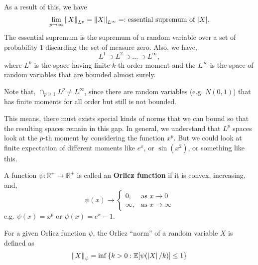 \documentclass[12pt]{article}
\begin{document}
As a result of this, we have
\begin{equation*}
    \lim_{p \to \infty} \left\Vert X \right\Vert_{L^p} = \left\Vert X \right\Vert_{L^\infty} =: \text{essential supremum of } |X|.
\end{equation*}
\noindent The essential supremum is the supremum of a random variable over a set of probability $1$ discarding the set of measure zero. Also, we have,
\begin{equation*}
    L^1 \supset L^2 \supset \dots \supset L^\infty,
\end{equation*}
\noindent where $L^k$ is the space having finite $k$-th order moment and the $L^\infty$ is the space of random variables that are bounded almost surely.

\begin{note}
    Note that, $\cap_{p \geq 1} L^p \neq L^\infty$, since there are random variables (e.g. $N(0,1)$) that has finite moments for all order but still is not bounded.
\end{note}

This means, there must exists special kinds of norms that we can bound so that the resulting spaces remain in this gap. In general, we understand that $L^p$ spaces look at the $p$-th moment by considering the function $x^p$. But we could look at finite expectation of different moments like $e^x$, or $\sin(x^2)$, or something like this.

\begin{definitionbox}
    A function $\psi: \mathbb{R}^+ \to \mathbb{R}^+$ is called an \textbf{Orlicz function} if it is convex, increasing, and,
    \begin{equation*}
        \psi(x) \to
        \begin{cases}
            0,      & \text{as } x \to 0      \\
            \infty, & \text{as } x \to \infty
        \end{cases}
    \end{equation*}
    \noindent e.g. $\psi(x) = x^p$ or $\psi(x) = e^x - 1$.
\end{definitionbox}

\begin{definitionbox}
    For a given Orlicz function $\psi$, the Orlicz ``norm'' of a random variable $X$ is defined as
    \begin{equation*}
        \left\Vert X \right\Vert_{\psi} = \inf\left\{ k > 0: \mathbb{E}[\psi(\left\lvert X \right\rvert/k)] \leq 1 \right\}
    \end{equation*}
\end{definitionbox}
\end{document}
